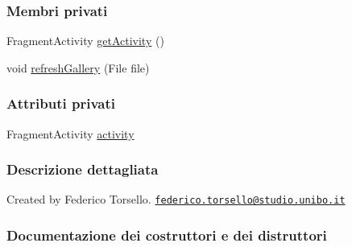 \subsubsection*{Membri privati}
\begin{DoxyCompactItemize}
\item 
Fragment\+Activity \hyperlink{classit_1_1unibo_1_1torsello_1_1bluetoothpositioning_1_1task_1_1SaveImageTask_a6fda270f42937b64e3767644e7dd63a5_a6fda270f42937b64e3767644e7dd63a5}{get\+Activity} ()
\item 
void \hyperlink{classit_1_1unibo_1_1torsello_1_1bluetoothpositioning_1_1task_1_1SaveImageTask_a813b3e0d75f59558de551aa6251e3d08_a813b3e0d75f59558de551aa6251e3d08}{refresh\+Gallery} (File file)
\end{DoxyCompactItemize}
\subsubsection*{Attributi privati}
\begin{DoxyCompactItemize}
\item 
Fragment\+Activity \hyperlink{classit_1_1unibo_1_1torsello_1_1bluetoothpositioning_1_1task_1_1SaveImageTask_a340aca6a2cdcfbf41aed236588669203_a340aca6a2cdcfbf41aed236588669203}{activity}
\end{DoxyCompactItemize}


\subsubsection{Descrizione dettagliata}
Created by Federico Torsello. \href{mailto:federico.torsello@studio.unibo.it}{\tt federico.\+torsello@studio.\+unibo.\+it} 

\subsubsection{Documentazione dei costruttori e dei distruttori}
\hypertarget{classit_1_1unibo_1_1torsello_1_1bluetoothpositioning_1_1task_1_1SaveImageTask_a73b35fbe1482ff046cc46ce21440824e_a73b35fbe1482ff046cc46ce21440824e}{}\label{classit_1_1unibo_1_1torsello_1_1bluetoothpositioning_1_1task_1_1SaveImageTask_a73b35fbe1482ff046cc46ce21440824e_a73b35fbe1482ff046cc46ce21440824e} 
